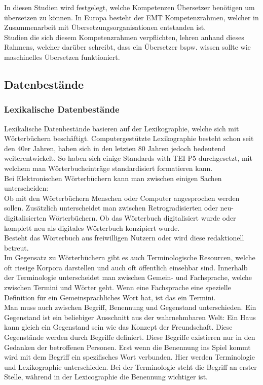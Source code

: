 \documentclass{article}
\begin{document}
	In diesen Studien wird festgelegt, welche Kompetenzen Übersetzer benötigen um übersetzen zu können. In Europa besteht der EMT Kompetenzrahmen, welcher in Zusammenarbeit mit Übersetzungsorganisationen entstanden ist. \\
	Studien die sich diesem Kompetenzrahmen verpflichten, lehren anhand dieses Rahmens, welcher darüber schreibt, dass ein Übersetzer bspw. wissen sollte wie maschinelles Übersetzen funktioniert.

	\subsection{Datenbestände}

	\subsubsection{Lexikalische Datenbestände}
	Lexikalische Datenbestände basieren auf der Lexikographie, welche sich mit Wörterbüchern beschäftigt. Computergestützte Lexikographie besteht schon seit den 40er Jahren, haben sich in den letzten 80 Jahren jedoch bedeutend weiterentwickelt. So haben sich einige Standards with TEI P5 durchgesetzt, mit welchem man Wörterbucheinträge standardisiert formatieren kann. \\
	Bei Elektronischen Wörterbüchern kann man zwischen einigen Sachen unterscheiden:\\
	Ob mit den Wörterbüchern Menschen oder Computer angesprochen werden sollen. Zusätzlich unterscheidet man zwischen Retrogradisierten oder neu-digitalisierten Wörterbüchern. Ob das Wörterbuch digitalisiert wurde oder komplett neu als digitales Wörterbuch konzipiert wurde. \\
	Besteht das Wörterbuch aus freiwilligen Nutzern oder wird diese redaktionell betreut. \\
	Im Gegensatz zu Wörterbüchern gibt es auch Terminologische Resourcen, welche oft riesige Korpora darstellen und auch oft öffentlich einsehbar sind. Innerhalb der Terminologie unterscheidet man zwischen Gemein- und Fachsprache, welche zwischen Termini und Wörter geht. Wenn eine Fachsprache eine spezielle Definition für ein Gemeinsprachliches Wort hat, ist das ein Termini. \\
	Man muss auch zwischen Begriff, Benennung und Gegenstand unterschieden. Ein Gegenstand ist ein beliebiger Ausschnitt aus der wahrnehmbaren Welt: Ein Haus kann gleich ein Gegenstand sein wie das Konzept der Freundschaft. Diese Gegenstände werden durch Begriffe definiert. Diese Begriffe existieren nur in den Gedanken der betroffenen Personen. Erst wenn die Benennung ins Spiel kommt wird mit dem Begriff ein spezifisches Wort verbunden. Hier werden Terminologie und Lexikographie unterschieden. Bei der Terminologie steht die Begriff an erster Stelle, während in der Lexicographie die Benennung wichtiger ist. \\
\end{document}
